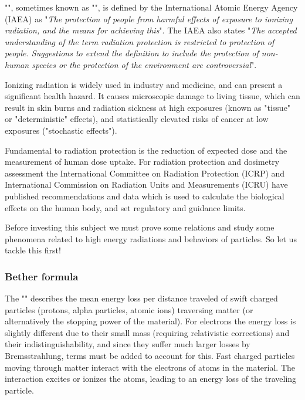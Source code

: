 	"", sometimes known as "", is defined by the International Atomic Energy Agency (IAEA) as "\textit{The protection of people from harmful effects of exposure to ionizing radiation, and the means for achieving this}". The IAEA also states "\textit{The accepted understanding of the term radiation protection is restricted to protection of people. Suggestions to extend the definition to include the protection of non-human species or the protection of the environment are controversial}".

	Ionizing radiation is widely used in industry and medicine, and can present a significant health hazard. It causes microscopic damage to living tissue, which can result in skin burns and radiation sickness at high exposures (known as "tissue" or "deterministic" effects), and statistically elevated risks of cancer at low exposures ("stochastic effects").

	Fundamental to radiation protection is the reduction of expected dose and the measurement of human dose uptake. For radiation protection and dosimetry assessment the International Committee on Radiation Protection (ICRP) and International Commission on Radiation Units and Measurements (ICRU) have published recommendations and data which is used to calculate the biological effects on the human body, and set regulatory and guidance limits.

	Before investing this subject we must prove some relations and study some phenomena related to high energy radiations and behaviors of particles. So let us tackle this first!

	\subsubsection{Bether formula}
	The "" describes the mean energy loss per distance traveled of swift charged particles (protons, alpha particles, atomic ions) traversing matter (or alternatively the stopping power of the material). For electrons the energy loss is slightly different due to their small mass (requiring relativistic corrections) and their indistinguishability, and since they suffer much larger losses by Bremsstrahlung, terms must be added to account for this. Fast charged particles moving through matter interact with the electrons of atoms in the material. The interaction excites or ionizes the atoms, leading to an energy loss of the traveling particle.
	
